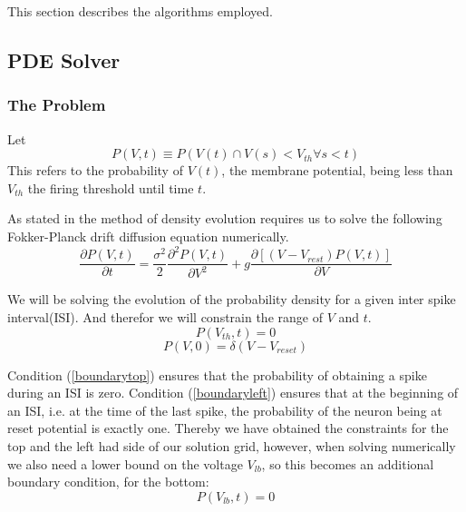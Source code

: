 \documentclass[10pt]{article}
\begin{document}
This section describes the algorithms employed.

\subsection{PDE Solver}

\subsubsection{The Problem}
Let 
\begin{equation}
    P(V,t) \equiv P(V(t) \cap  V(s) < V_{th} \forall s < t)
\end{equation}
This refers to the probability of $V(t)$, the membrane potential,
being less than $V_{th}$ the firing threshold until time $t$.  

As stated in \cite{PaninskiPillowSimoncelli} the method of density
evolution requires us to solve the
following Fokker-Planck drift diffusion equation numerically.
\begin{equation}
    \frac{\partial P(V,t)}{\partial t} =
    \frac{\sigma^2}{2} \frac{\partial^2 P(V,t) } {\partial V^2} +
    g\frac{\partial[(V-V_{rest})P(V,t)]}{\partial V}
    \label{fokkerplanck}
\end{equation}

We will be solving the evolution of the probability density for a
given inter spike interval(ISI). And therefor we will constrain the range
of $V$ and $t$.
\begin{equation}
    P(V_{th},t) = 0
    \label{boundarytop}
\end{equation}
\begin{equation}
    P(V,0) = \delta(V-V_{reset})
    \label{boundaryleft}
\end{equation}

Condition (\ref{boundarytop}) ensures that the probability of obtaining a spike
during an ISI is zero. Condition (\ref{boundaryleft}) ensures
that at the beginning of an ISI, i.e. at the time of the last spike,
the probability of the neuron being at reset potential is exactly one.
Thereby we have obtained the constraints for the top and the left had
side of our solution grid, however, when solving numerically we also
need a lower bound on the voltage $V_{lb}$, so this becomes an
additional boundary condition, for the  bottom:
\begin{equation}
    P(V_{lb},t) = 0 
    \label{boundarybottom}
\end{equation}
\end{document}
